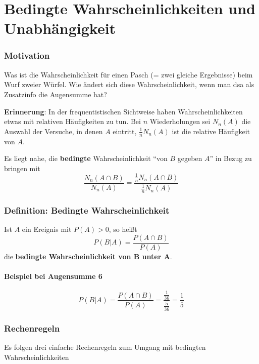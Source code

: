 \part{Bedingte Wahrscheinlichkeiten und Unabhängigkeit}

\section{Motivation}
Was ist die Wahrscheinlichkeit für einen Pasch (= zwei gleiche Ergebnisse) beim Wurf zweier Würfel.
Wie ändert sich diese Wahrscheinlichkeit, wenn man dsa als Zusatzinfo die Augensumme hat?

\textbf{Erinnerung}:
In der frequentistischen Sichtweise haben Wahrscheinlichkeiten etwas mit relativen Häufigkeiten zu tun.
Bei $n$ Wiederholungen sei $N_n(A)$ die Auswahl der Versuche, in denen $A$ eintritt, $ \frac{1}{n}N_n(A) $ ist die relative Häufigkeit von $A$.

Es liegt nahe, die \textbf{bedingte} Wahrscheinlichkeit ``von $B$ gegeben $A$'' in Bezug zu bringen mit 
\[
	\frac{N_n(A\cap B)}{N_n(A)} = \frac{\frac{1}{n}N_n(A\cap B)}{\frac{1}{n}N_n(A)}  
\]

\section{Definition: Bedingte Wahrscheinlichkeit}

Ist $A$ ein Ereignis mit $P(A)>0$, so heißt
\begin{equation}
	P(B|A) = \frac{P(A \cap B)}{P(A)}
\end{equation}
die \textbf{bedingte Wahrscheinlichkeit von B unter A}.

\subsection{Beispiel bei Augensumme 6}

\[
	P(B|A) = \frac{P(A \cap B)}{P(A)} = \frac{ \frac{1}{36} }{ \frac{5}{36} } = \frac{1}{5}
\]

\section{Rechenregeln}

Es folgen drei einfache Rechenregeln zum Umgang mit bedingten Wahrscheinlichkeiten

